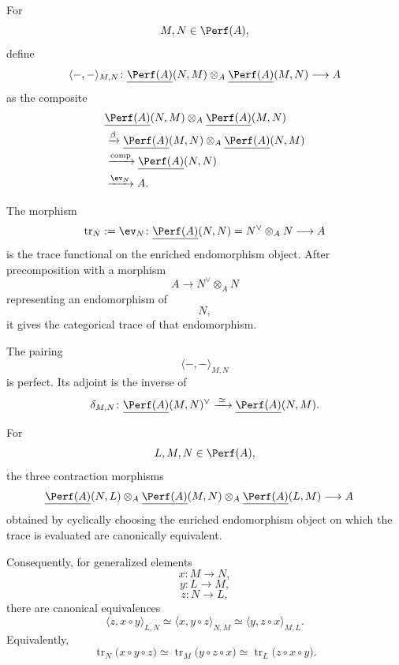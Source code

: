 \begin{proposition}
\label{prop:perfect-trace-pairing}
For
\[
    M,N\in\Perf(A),
\]
define
\[
    \langle-,-\rangle_{M,N}
    \colon
    \underline{\Perf(A)}(N,M)
    \otimes_A
    \underline{\Perf(A)}(M,N)
    \longrightarrow
    A
\]
as the composite
\[
\begin{aligned}
    &
    \underline{\Perf(A)}(N,M)
    \otimes_A
    \underline{\Perf(A)}(M,N)
    \\
    &\xrightarrow{\beta}
    \underline{\Perf(A)}(M,N)
    \otimes_A
    \underline{\Perf(A)}(N,M)
    \\
    &\xrightarrow{\mathrm{comp}}
    \underline{\Perf(A)}(N,N)
    \\
    &\xrightarrow{\ev_N}
    A.
\end{aligned}
\]

The morphism
\[
    \operatorname{tr}_N
    :=
    \ev_N
    \colon
    \underline{\Perf(A)}(N,N)
    =
    N^\vee\otimes_A N
    \longrightarrow
    A
\]
is the trace functional on the enriched endomorphism object. After
precomposition with a morphism
\[
    A
    \longrightarrow
    N^\vee\otimes_A N
\]
representing an endomorphism of
\[
    N,
\]
it gives the categorical trace of that endomorphism.

The pairing
\[
    \langle-,-\rangle_{M,N}
\]
is perfect. Its adjoint is the inverse of
\[
    \delta_{M,N}
    \colon
    \underline{\Perf(A)}(M,N)^\vee
    \xrightarrow{\;\simeq\;}
    \underline{\Perf(A)}(N,M).
\]

For
\[
    L,M,N\in\Perf(A),
\]
the three contraction morphisms
\[
\begin{aligned}
    &
    \underline{\Perf(A)}(N,L)
    \otimes_A
    \underline{\Perf(A)}(M,N)
    \otimes_A
    \underline{\Perf(A)}(L,M)
    \longrightarrow
    A
\end{aligned}
\]
obtained by cyclically choosing the enriched endomorphism object on which
the trace is evaluated are canonically equivalent.

Consequently, for generalized elements
\[
    x
    \colon
    M
    \longrightarrow
    N,
\]
\[
    y
    \colon
    L
    \longrightarrow
    M,
\]
\[
    z
    \colon
    N
    \longrightarrow
    L,
\]
there are canonical equivalences
\[
    \langle z,x\circ y\rangle_{L,N}
    \simeq
    \langle x,y\circ z\rangle_{N,M}
    \simeq
    \langle y,z\circ x\rangle_{M,L}.
\]
Equivalently,
\[
    \operatorname{tr}_N
    \bigl(
        x\circ y\circ z
    \bigr)
    \simeq
    \operatorname{tr}_M
    \bigl(
        y\circ z\circ x
    \bigr)
    \simeq
    \operatorname{tr}_L
    \bigl(
        z\circ x\circ y
    \bigr).
\]


\end{proposition}
